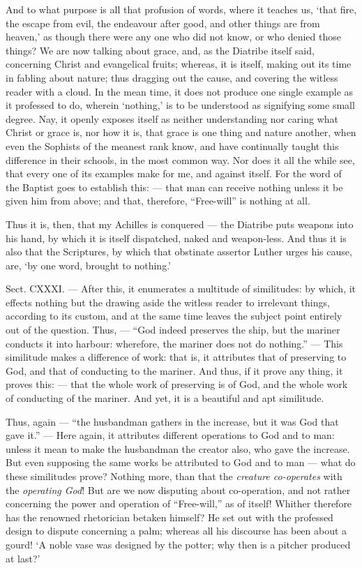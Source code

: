 And to what purpose is all that profusion of words, where it teaches us, ‘that fire, the escape from evil, the endeavour after good, and other things are from heaven,’ as though there were any one who did not know, or who denied those things? We are now talking about grace, and, as the Diatribe itself said, concerning Christ and evangelical fruits; whereas, it is itself, making out its time in fabling about nature; thus dragging out the cause, and covering the witless reader with a cloud. In the mean time, it does not produce one single example as it professed to do, wherein ‘nothing,’ is to be understood as signifying some small degree. Nay, it openly exposes itself as neither understanding nor caring what Christ or grace is, nor how it is, that grace is one thing and nature another, when even the Sophists of the meanest rank know, and have continually taught this difference in their schools, in the most common way. Nor does it all the while see, that every one of its examples make for me, and against itself. For the word of the Baptist goes to establish this: — that man can receive nothing unless it be given him from above; and that, therefore, “Free-will” is nothing at all.

Thus it is, then, that my Achilles is conquered — the Diatribe puts weapons into his hand, by which it is itself dispatched, naked and weapon-less. And thus it is also that the Scriptures, by which that obstinate assertor Luther urges his cause, are, ‘by one word, brought to nothing.’


Sect. CXXXI. — After this, it enumerates a multitude of similitudes: by which, it effects nothing but the drawing aside the witless reader to irrelevant things, according to its custom, and at the same time leaves the subject point entirely out of the question. Thus, — “God indeed preserves the ship, but the mariner conducts it into harbour: wherefore, the mariner does not do nothing.” — This similitude makes a difference of work: that is, it attributes that of preserving to God, and that of conducting to the mariner. And thus, if it prove any thing, it proves this: — that the whole work of preserving is of God, and the whole work of conducting of the mariner. And yet, it is a beautiful and apt similitude.

Thus, again — “the husbandman gathers in the increase, but it was God that gave it.” — Here again, it attributes different operations to God and to man: unless it mean to make the husbandman the creator also, who gave the increase. But even supposing the same works be attributed to God and to man — what do these similitudes prove? Nothing more, than that the \emph{creature co-operates }with the \emph{operating God}! But are we now disputing about co-operation, and not rather concerning the power and operation of “Free-will,” as of itself! Whither therefore has the renowned rhetorician betaken himself? He set out with the professed design to dispute concerning a palm; whereas all his discourse has been about a gourd! ‘A noble vase was designed by the potter; why then is a pitcher produced at last?’

